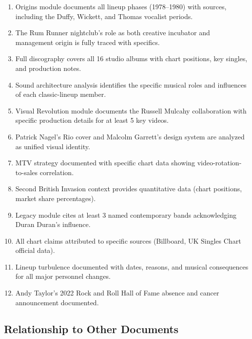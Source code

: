 \documentclass[11pt,letterpaper]{article}
\begin{document}
\begin{enumerate}
  \item Origins module documents all lineup phases (1978--1980) with sources, including the Duffy, Wickett, and Thomas vocalist periods.
  \item The Rum Runner nightclub's role as both creative incubator and management origin is fully traced with specifics.
  \item Full discography covers all 16 studio albums with chart positions, key singles, and production notes.
  \item Sound architecture analysis identifies the specific musical roles and influences of each classic-lineup member.
  \item Visual Revolution module documents the Russell Mulcahy collaboration with specific production details for at least 5 key videos.
  \item Patrick Nagel's Rio cover and Malcolm Garrett's design system are analyzed as unified visual identity.
  \item MTV strategy documented with specific chart data showing video-rotation-to-sales correlation.
  \item Second British Invasion context provides quantitative data (chart positions, market share percentages).
  \item Legacy module cites at least 3 named contemporary bands acknowledging Duran Duran's influence.
  \item All chart claims attributed to specific sources (Billboard, UK Singles Chart official data).
  \item Lineup turbulence documented with dates, reasons, and musical consequences for all major personnel changes.
  \item Andy Taylor's 2022 Rock and Roll Hall of Fame absence and cancer announcement documented.
\end{enumerate}

\subsection{Relationship to Other Documents}
\end{document}

